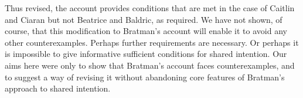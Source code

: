 \documentclass[12pt,\papersize]{extarticle}
\begin{document}
Thus revised, the account provides conditions that are met in the case of Caitlin and Ciaran but not Beatrice and Baldric, as required.
We have not shown, of course, that this modification to Bratman's account will enable it to avoid any other counterexamples.
Perhaps further requirements are necessary.
Or perhaps it is impossible to give informative sufficient conditions for shared intention.
Our aims here were only 
		to show that Bratman's account faces counterexamples,
	and 
		to suggest a way of revising it without abandoning core features of Bratman's approach to shared intention.
		
%
%
%
%
%
%	
\end{document}
